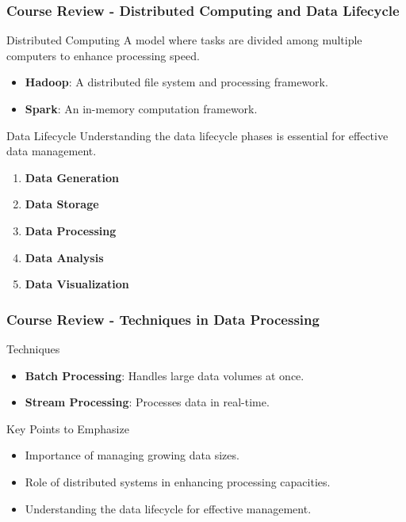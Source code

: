 \documentclass[aspectratio=169]{beamer}
\begin{document}
\begin{frame}[fragile]
    \frametitle{Course Review - Distributed Computing and Data Lifecycle}
    \begin{block}{Distributed Computing}
        A model where tasks are divided among multiple computers to enhance processing speed.
        \begin{itemize}
            \item \textbf{Hadoop}: A distributed file system and processing framework.
            \item \textbf{Spark}: An in-memory computation framework.
        \end{itemize}
    \end{block}

    \begin{block}{Data Lifecycle}
        Understanding the data lifecycle phases is essential for effective data management.
        \begin{enumerate}
            \item \textbf{Data Generation}
            \item \textbf{Data Storage}
            \item \textbf{Data Processing}
            \item \textbf{Data Analysis}
            \item \textbf{Data Visualization}
        \end{enumerate}
    \end{block}
\end{frame}

\begin{frame}[fragile]
    \frametitle{Course Review - Techniques in Data Processing}
    \begin{block}{Techniques}
        \begin{itemize}
            \item \textbf{Batch Processing}: Handles large data volumes at once.
            \item \textbf{Stream Processing}: Processes data in real-time.
        \end{itemize}
    \end{block}
    
    \begin{block}{Key Points to Emphasize}
        \begin{itemize}
            \item Importance of managing growing data sizes.
            \item Role of distributed systems in enhancing processing capacities.
            \item Understanding the data lifecycle for effective management.
        \end{itemize}
    \end{block}
\end{frame}
\end{document}
